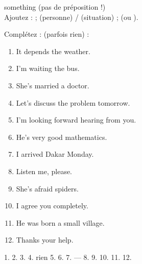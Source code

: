 \begin{piege}
 \ra {} \qquad
{} \ra {} something \qquad
{} \ra {} (pas de préposition !)\\
Ajoutez :  \ra {} ;  \ra
{} (personne) /  (situation) ;
 \ra {} (ou ).
\end{piege}

\begin{exo}[10.1 --- Prépositions]
Complétez :  (parfois rien) :
\begin{enumerate}
  \item It depends \trou[1.2cm] the weather.
  \item I'm waiting \trou[1.2cm] the bus.
  \item She's married \trou[1.2cm] a doctor.
  \item Let's discuss \trou[1.2cm] the problem tomorrow.
  \item I'm looking forward \trou[1.2cm] hearing from you.
  \item He's very good \trou[1.2cm] mathematics.
  \item I arrived \trou[1.2cm] Dakar \trou[1.2cm] Monday.
  \item Listen \trou[1.2cm] me, please.
  \item She's afraid \trou[1.2cm] spiders.
  \item I agree \trou[1.2cm] you completely.
  \item He was born \trou[1.2cm] a small village.
  \item Thanks \trou[1.2cm] your help.
\end{enumerate}
\end{exo}
\begin{corrige}[10.1]
1.  2.  3.  4. rien 5.  6. 
7.  ---  8.  9.  10.  11.  12. 
\end{corrige}

